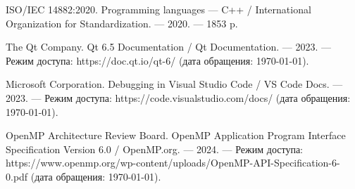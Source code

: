 \begin{thebibliography}{}
 ISO/IEC 14882:2020. Programming languages --- C++ / International Organization for Standardization. --- 2020. --- 1853 p.

 The Qt Company. Qt 6.5 Documentation / Qt Documentation. --- 2023. --- Режим доступа: https://doc.qt.io/qt-6/ (дата обращения: \today).

 Microsoft Corporation. Debugging in Visual Studio Code / VS Code Docs. --- 2023. --- Режим доступа: https://code.visualstudio.com/docs/ (дата обращения: \today).

 OpenMP Architecture Review Board. OpenMP Application Program Interface Specification Version 6.0 / OpenMP.org. --- 2024. --- Режим доступа: https://www.openmp.org/wp-content/uploads/OpenMP-API-Specification-6-0.pdf (дата обращения: \today).


\end{thebibliography}